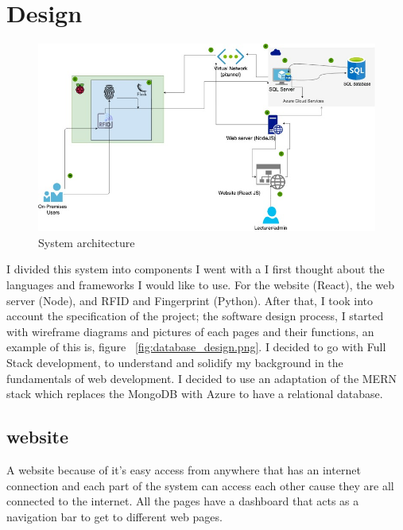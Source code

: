 \section{Design}
\begin{figure}[ht]
  \includegraphics[scale=0.56]{Design & Implementation/images/system architecture.jpg}
  \caption{System architecture}
\end{figure}
I divided this system into components 
I went with a I first thought about the languages and frameworks I would like to use. For the website (React), the web server (Node), and RFID and Fingerprint (Python). After that, I took into account the specification of the project; the software design process,
I started with wireframe diagrams and pictures of each pages and their functions, an example of this is, figure ~\ref{fig:database_design.png}. I decided to go with Full Stack development, to understand and solidify my background in the fundamentals of web development. I decided to use an adaptation of the MERN stack which replaces the MongoDB with Azure to have a relational database.

\subsection{website}
A website because of it's easy access from anywhere that has an internet connection and each part of the system can access each other cause they are all connected to the internet.
All the pages have a dashboard that acts as a navigation bar to get to different web pages. 

